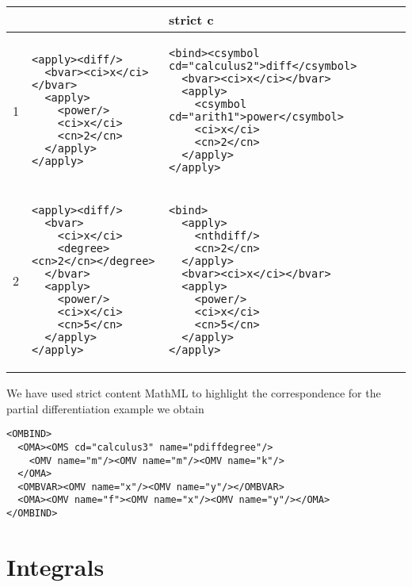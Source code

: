 \documentclass[12pt]{article}
\begin{document}
\begin{center}\lstset{frame=none,numbers=none,lineskip=-.7ex,aboveskip=-.5em,belowskip=-1em,language=MathML}
\begin{tabular}{|l|p{5.5cm}|p{8cm}|}\hline
 &  {\mathml2} & strict c{\mathml3}\\\hline
 1 &
\begin{lstlisting}
<apply><diff/>
  <bvar><ci>x</ci></bvar>
  <apply>
    <power/>
    <ci>x</ci>
    <cn>2</cn>
  </apply>
</apply>
\end{lstlisting}
&
\begin{lstlisting}
<bind><csymbol cd="calculus2">diff</csymbol>
  <bvar><ci>x</ci></bvar>
  <apply>
    <csymbol cd="arith1">power</csymbol>
    <ci>x</ci>
    <cn>2</cn>
  </apply>
</apply>
\end{lstlisting}
\\\hline
2 & 
\begin{lstlisting}[language=MathML]
<apply><diff/>
  <bvar>
    <ci>x</ci>
    <degree><cn>2</cn></degree>
  </bvar>
  <apply>
    <power/>
    <ci>x</ci>
    <cn>5</cn>
  </apply>
</apply>
\end{lstlisting}
&
\begin{lstlisting}[language=MathML]
<bind>
  <apply>
    <nthdiff/>
    <cn>2</cn>
  </apply>
  <bvar><ci>x</ci></bvar>
  <apply>
    <power/>
    <ci>x</ci>
    <cn>5</cn>
  </apply>
</apply>
\end{lstlisting}
\\\hline
\end{tabular}
\end{center}
We have used strict content MathML to highlight the correspondence for the partial
differentiation example we obtain 
\begin{lstlisting}[language=OpenMath]
<OMBIND>
  <OMA><OMS cd="calculus3" name="pdiffdegree"/>
    <OMV name="m"/><OMV name="m"/><OMV name="k"/>
  </OMA>
  <OMBVAR><OMV name="x"/><OMV name="y"/></OMBVAR>
  <OMA><OMV name="f"><OMV name="x"/><OMV name="y"/></OMA>
</OMBIND>
\end{lstlisting}

\section{Integrals}
\end{document}
